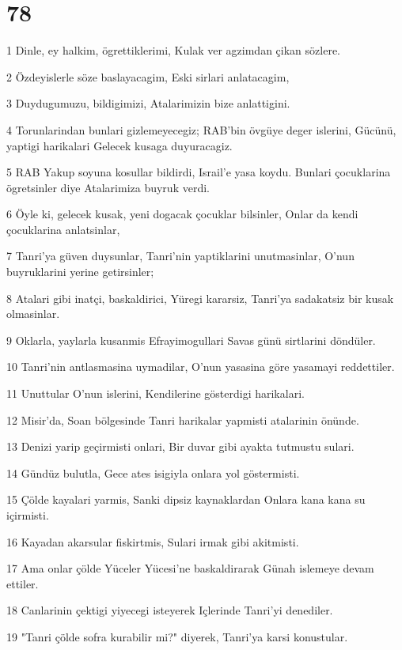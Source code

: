 \chapter{78}

\par 1 Dinle, ey halkim, ögrettiklerimi, Kulak ver agzimdan çikan sözlere.
\par 2 Özdeyislerle söze baslayacagim, Eski sirlari anlatacagim,
\par 3 Duydugumuzu, bildigimizi, Atalarimizin bize anlattigini.
\par 4 Torunlarindan bunlari gizlemeyecegiz; RAB'bin övgüye deger islerini, Gücünü, yaptigi harikalari Gelecek kusaga duyuracagiz.
\par 5 RAB Yakup soyuna kosullar bildirdi, Israil'e yasa koydu. Bunlari çocuklarina ögretsinler diye Atalarimiza buyruk verdi.
\par 6 Öyle ki, gelecek kusak, yeni dogacak çocuklar bilsinler, Onlar da kendi çocuklarina anlatsinlar,
\par 7 Tanri'ya güven duysunlar, Tanri'nin yaptiklarini unutmasinlar, O'nun buyruklarini yerine getirsinler;
\par 8 Atalari gibi inatçi, baskaldirici, Yüregi kararsiz, Tanri'ya sadakatsiz bir kusak olmasinlar.
\par 9 Oklarla, yaylarla kusanmis Efrayimogullari Savas günü sirtlarini döndüler.
\par 10 Tanri'nin antlasmasina uymadilar, O'nun yasasina göre yasamayi reddettiler.
\par 11 Unuttular O'nun islerini, Kendilerine gösterdigi harikalari.
\par 12 Misir'da, Soan bölgesinde Tanri harikalar yapmisti atalarinin önünde.
\par 13 Denizi yarip geçirmisti onlari, Bir duvar gibi ayakta tutmustu sulari.
\par 14 Gündüz bulutla, Gece ates isigiyla onlara yol göstermisti.
\par 15 Çölde kayalari yarmis, Sanki dipsiz kaynaklardan Onlara kana kana su içirmisti.
\par 16 Kayadan akarsular fiskirtmis, Sulari irmak gibi akitmisti.
\par 17 Ama onlar çölde Yüceler Yücesi'ne baskaldirarak Günah islemeye devam ettiler.
\par 18 Canlarinin çektigi yiyecegi isteyerek Içlerinde Tanri'yi denediler.
\par 19 "Tanri çölde sofra kurabilir mi?" diyerek, Tanri'ya karsi konustular.
